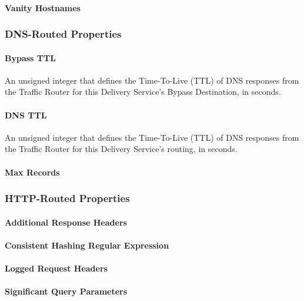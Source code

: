 \paragraph{Vanity Hostnames}

\subsubsection{DNS-Routed Properties}

\paragraph{Bypass TTL}
An unsigned integer that defines the Time-To-Live (TTL) of DNS responses from
the Traffic Router for this Delivery Service's Bypass Destination, in seconds.

\paragraph{DNS TTL}
An unsigned integer that defines the Time-To-Live (TTL) of DNS responses from
the Traffic Router for this Delivery Service's routing, in seconds.

\paragraph{Max Records}

\subsubsection{HTTP-Routed Properties}

\paragraph{Additional Response Headers}

\paragraph{Consistent Hashing Regular Expression}

\paragraph{Logged Request Headers}

\paragraph{Significant Query Parameters}

